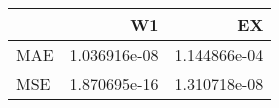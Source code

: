 \begin{tabular}{lrr}
\toprule
{} &            W1 &            EX \\
\midrule
MAE &  1.036916e-08 &  1.144866e-04 \\
MSE &  1.870695e-16 &  1.310718e-08 \\
\bottomrule
\end{tabular}
